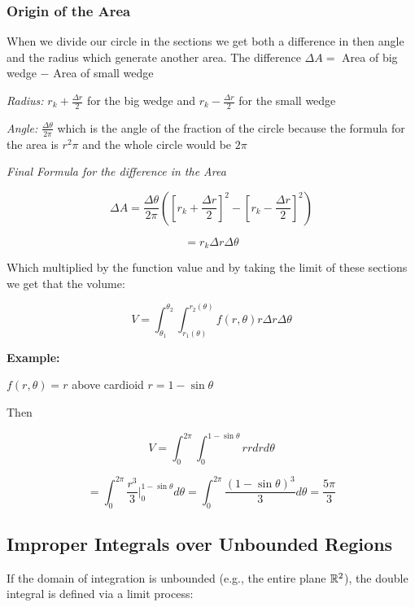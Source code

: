 \subsubsection{Origin of the Area}

When we divide our circle in the sections we get both a difference in then angle and the radius which 
generate another area. The difference \(\Delta A =\) Area of big wedge \(-\) Area of small wedge
\vspace{\baselineskip}

\emph{Radius: }\(r_k + \frac{\Delta r}{2}\) for the big wedge and \(r_k - \frac{\Delta r}{2}\) for the 
small wedge
\vspace{\baselineskip}

\emph{Angle: }\(\frac{\Delta \theta}{2 \pi}\) which is the angle of the fraction of the circle 
because the formula for the area is \(r^2 \pi\) and the whole circle would be \(2\pi\)
\vspace{\baselineskip}

\emph{Final Formula for the difference in the Area}

\[
    \Delta A = \frac{\Delta \theta}{2 \pi} \left ( {\left[r_k + \frac{\Delta r}{2}\right]}^2 - 
    {\left[r_k - \frac{\Delta r}{2}\right]}^2\right)
\] 

\[ 
    = r_k \Delta r \Delta \theta
\]

Which multiplied by the function value and by taking the limit of these sections we get that the volume:

\[
    V = \int_{\theta_1}^{\theta_2} \int_{r_1 (\theta)}^{r_2 (\theta)} f(r, \theta) r \Delta r \Delta 
    \theta
\]

\textbf{Example:}
\vspace{\baselineskip}

\(f(r, \theta) = r\) above cardioid \(r = 1 - \sin \theta\)

Then

\[
    V = \int_{0}^{2\pi}\int_{0}^{1 - \sin \theta} r r dr d\theta
\]

\[
    = \int_{0}^{2\pi}\frac{r^3}{3} |_{0}^{1 - \sin \theta} d\theta = \int_{0}^{2\pi} 
    \frac{{(1 - \sin\theta)}^3}{3} d\theta = \frac{5 \pi}{3}
\]


\subsection{Improper Integrals over Unbounded Regions}

If the domain of integration is unbounded (e.g., the entire plane \( \mathbb{R}^2 \)), the double integral is 
defined via a limit process:


